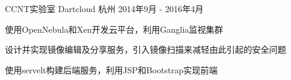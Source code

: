 \cventry
{CCNT实验室} %
{Dartcloud} %
{杭州} %
{2014年9月 - 2016年4月} %
{ %
\begin{cvitems}
    \item {使用OpenNebula和Xen开发云平台，利用Ganglia监视集群}
    \item {设计并实现镜像编辑及分享服务，引入镜像扫描来减轻由此引起的安全问题}
    \item {使用servelt构建后端服务，利用JSP和Bootstrap实现前端}
\end{cvitems}
}
